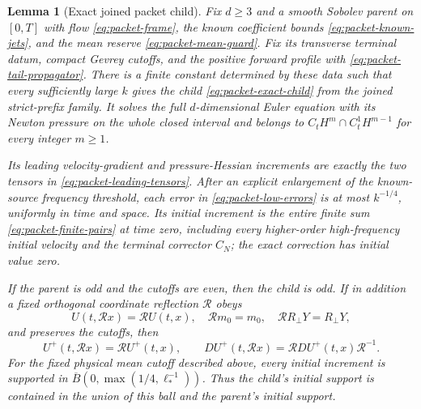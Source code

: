 \documentclass[11pt]{article}
\newtheorem{lemma}[theorem]{Lemma}
\theoremstyle{definition}
\begin{document}
\begin{lemma}[Exact joined packet child]\label{lem:exact-packet-child}
Fix $d\ge3$ and a smooth Sobolev parent on $[0,T]$ with flow
\eqref{eq:packet-frame}, the known coefficient bounds
\eqref{eq:packet-known-jets}, and the mean reserve
\eqref{eq:packet-mean-guard}. Fix its transverse terminal datum, compact
Gevrey cutoffs, and the positive forward profile with
\eqref{eq:packet-tail-propagator}. There is a finite constant determined
by these data such that every sufficiently large $k$ gives the child
\eqref{eq:packet-exact-child} from the joined strict-prefix family.
It solves the full $d$-dimensional Euler equation with its Newton pressure
on the whole closed interval and belongs to
$C_tH^m\cap C_t^1H^{m-1}$ for every integer $m\ge1$.

Its leading velocity-gradient and pressure-Hessian increments are
exactly the two tensors in \eqref{eq:packet-leading-tensors}. After an
explicit enlargement of the known-source frequency threshold, each
error in \eqref{eq:packet-low-errors} is at most $k^{-1/4}$, uniformly in
time and space. Its initial increment is the entire finite sum
\eqref{eq:packet-finite-pairs} at time zero, including every higher-order
high-frequency initial velocity and the terminal corrector $C_N$; the exact correction
has initial value zero.

If the parent is odd and the cutoffs are even, then the child is odd.
If in addition a fixed orthogonal coordinate reflection $\mathscr R$
obeys
\[
 U(t,\mathscr Rx)=\mathscr R U(t,x),\quad
 \mathscr R m_0=m_0,\quad \mathscr R R_\perp Y=R_\perp Y,
\]
and preserves the cutoffs, then
\[
 U^+(t,\mathscr Rx)=\mathscr R U^+(t,x),\qquad
 DU^+(t,\mathscr Rx)=\mathscr R DU^+(t,x)\mathscr R^{-1}.
\]
For the fixed physical mean cutoff described above, every
initial increment is supported in
$\overline B(0,\max(1/4,\ell_*^{-1}))$. Thus the child's initial support
is contained in the union of this ball and the parent's initial support.
\end{lemma}
\end{document}
